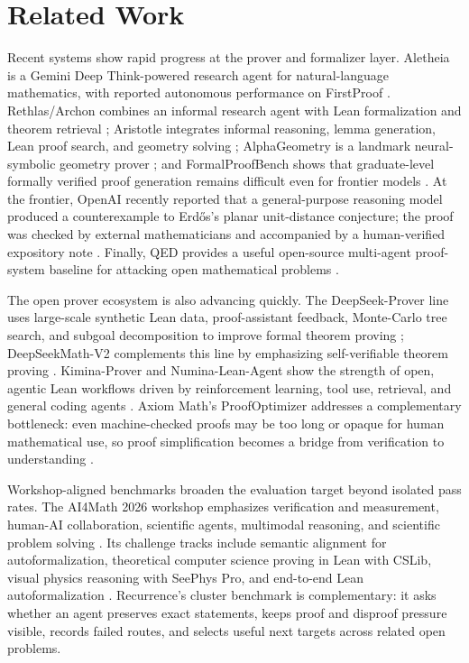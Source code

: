 \documentclass{article}
\theoremstyle{definition}
\theoremstyle{remark}
\begin{document}
\section{Related Work}

Recent systems show rapid progress at the prover and formalizer layer. Aletheia is a Gemini Deep Think-powered research agent for natural-language mathematics, with reported autonomous performance on FirstProof \citep{feng2026towards,feng2026firstproof}. Rethlas/Archon combines an informal research agent with Lean formalization and theorem retrieval \citep{ju2026automated}; Aristotle integrates informal reasoning, lemma generation, Lean proof search, and geometry solving \citep{aristotle2025imo}; AlphaGeometry is a landmark neural-symbolic geometry prover \citep{trinh2024alphageometry}; and FormalProofBench shows that graduate-level formally verified proof generation remains difficult even for frontier models \citep{ravi2026formalproofbench}. At the frontier, OpenAI recently reported that a general-purpose reasoning model produced a counterexample to Erd\H{o}s's planar unit-distance conjecture; the proof was checked by external mathematicians and accompanied by a human-verified expository note \citep{openai2026unitdistance,alon2026unitdistance}. Finally, QED provides a useful open-source multi-agent proof-system baseline for attacking open mathematical problems \citep{an2026qed}.

The open prover ecosystem is also advancing quickly. The DeepSeek-Prover line uses large-scale synthetic Lean data, proof-assistant feedback, Monte-Carlo tree search, and subgoal decomposition to improve formal theorem proving \citep{xin2024deepseekprover,xin2024deepseekprover15,ren2025deepseekproverv2}; DeepSeekMath-V2 complements this line by emphasizing self-verifiable theorem proving \citep{shao2025deepseekmathv2}. Kimina-Prover and Numina-Lean-Agent show the strength of open, agentic Lean workflows driven by reinforcement learning, tool use, retrieval, and general coding agents \citep{wang2025kimina,liu2026numinaleangagent}. Axiom Math's ProofOptimizer addresses a complementary bottleneck: even machine-checked proofs may be too long or opaque for human mathematical use, so proof simplification becomes a bridge from verification to understanding \citep{gu2026proofoptimizer}.

Workshop-aligned benchmarks broaden the evaluation target beyond isolated pass rates. The AI4Math 2026 workshop emphasizes verification and measurement, human-AI collaboration, scientific agents, multimodal reasoning, and scientific problem solving \citep{ai4math2026workshop}. Its challenge tracks include semantic alignment for autoformalization, theoretical computer science proving in Lean with CSLib, visual physics reasoning with SeePhys Pro, and end-to-end Lean autoformalization \citep{barrett2026cslib,xiang2026seephyspro}. Recurrence's cluster benchmark is complementary: it asks whether an agent preserves exact statements, keeps proof and disproof pressure visible, records failed routes, and selects useful next targets across related open problems.
\end{document}
